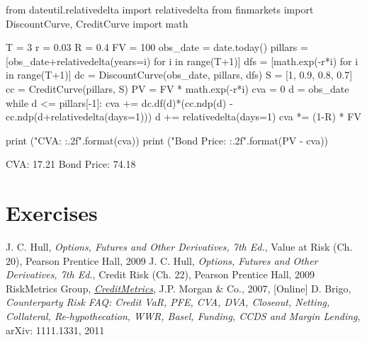 \begin{ipython}
from dateutil.relativedelta import relativedelta
from finmarkets import DiscountCurve, CreditCurve
import math

T = 3
r = 0.03
R = 0.4
FV = 100
obs_date = date.today()
pillars = [obs_date+relativedelta(years=i) for i in range(T+1)]
dfs = [math.exp(-r*i) for i in range(T+1)]
dc = DiscountCurve(obs_date, pillars, dfs)
S = [1, 0.9, 0.8, 0.7]
cc = CreditCurve(pillars, S)
PV = FV * math.exp(-r*i)
cva = 0
d = obs_date
while d <= pillars[-1]:
    cva += dc.df(d)*(cc.ndp(d) - cc.ndp(d+relativedelta(days=1)))
    d += relativedelta(days=1)
cva *= (1-R) * FV

print ("CVA: {:.2f}".format(cva))
print ("Bond Price: {:.2f}".format(PV - cva))
\end{ipython}
\begin{ioutput}
CVA: 17.21
Bond Price: 74.18
\end{ioutput}

\section{Exercises}


\begin{thebibliography}{9}
 J. C. Hull, \emph{Options, Futures and Other Derivatives, 7th Ed.}, Value at Risk (Ch. 20), Pearson Prentice Hall, 2009
 J. C. Hull, \emph{Options, Futures and Other Derivatives, 7th Ed.}, Credit Risk (Ch. 22), Pearson Prentice Hall, 2009
RiskMetrics Group, \href{https://www.msci.com/documents/10199/93396227-d449-4229-9143-24a94dab122f}{\emph{CreditMetrics}}, J.P. Morgan \& Co., 2007, [Online]
 D. Brigo, \emph{Counterparty Risk FAQ: Credit VaR, PFE, CVA, DVA, Closeout, Netting, Collateral, Re-hypothecation, WWR, Basel, Funding, CCDS and Margin Lending}, arXiv: 1111.1331, 2011
\end{thebibliography}